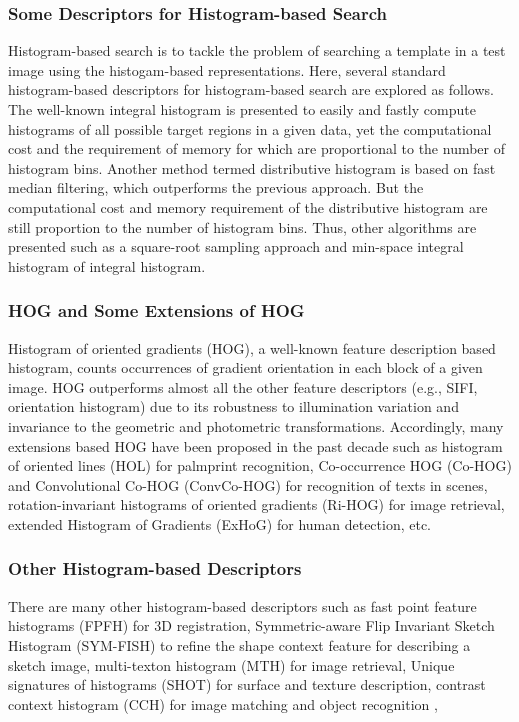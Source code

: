 \documentclass{article}
\begin{document}
\subsubsection{Some Descriptors for Histogram-based Search}
Histogram-based search is to tackle the problem of searching a template in a test image using the histogam-based representations. Here, several standard histogram-based descriptors for histogram-based search are explored as follows.\\ 
The well-known integral histogram is presented to easily and fastly compute histograms of all possible target regions in a given data, yet the computational cost and the requirement of memory for which are proportional to the number of histogram bins\cite{Porikli2005}. Another method termed distributive histogram is based on fast median filtering, which outperforms the previous approach\cite{M.SizintsevK.G.Derpanis2008}. But the computational cost and memory requirement of the distributive histogram are still proportion to the number of histogram bins. Thus, other algorithms are presented such as a square-root sampling approach\cite{Chang2010} and min-space integral histogram of integral histogram\cite{Dubuisson2012}.
\subsubsection{HOG and Some Extensions of HOG}
Histogram of oriented gradients (HOG), a well-known feature description based histogram, counts occurrences of gradient orientation in each block of a given image. HOG outperforms almost all the other feature descriptors (e.g., SIFI, orientation histogram\cite{Freeman1995}) due to its robustness to illumination variation and invariance to the geometric and photometric transformations. Accordingly, many extensions based HOG have been proposed in the past decade such as histogram of oriented lines (HOL) for palmprint recognition\cite{Jia2014}, Co-occurrence HOG (Co-HOG) and Convolutional Co-HOG (ConvCo-HOG) for recognition of texts in scenes\cite{Tian2015}, rotation-invariant histograms of oriented gradients (Ri-HOG) for image retrieval\cite{Chen2015}, extended Histogram of Gradients (ExHoG) for human detection\cite{Satpathy2014}, etc. 
\subsubsection{Other Histogram-based Descriptors}
There are many other histogram-based descriptors such as fast point feature histograms (FPFH) for 3D registration\cite{Rusu}, Symmetric-aware Flip Invariant Sketch Histogram (SYM-FISH) to refine the shape context feature for describing a sketch image\cite{Cao2013}, multi-texton histogram (MTH) for image retrieval\cite{Liu2010}, 
Unique signatures of histograms (SHOT) for surface and texture description\cite{Salti2014}, contrast context histogram (CCH) for image matching and object recognition
\cite{Huang2008},
\end{document}

